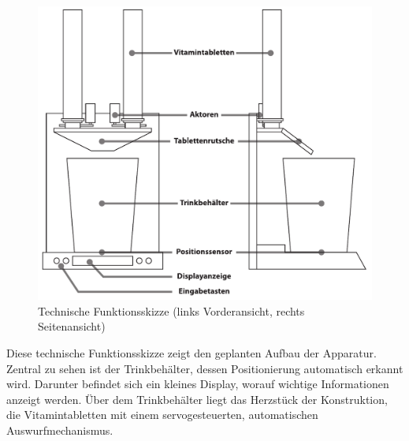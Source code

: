 \begin{figure}[H]
	\centering
	\includegraphics[width=1.0\linewidth]{chapter/Bilder/schematic_bw}
	\caption{Technische Funktionsskizze (links Vorderansicht, rechts Seitenansicht)}
	\label{fig:schematicbw}
\end{figure}

Diese technische Funktionsskizze zeigt den geplanten Aufbau der Apparatur. Zentral zu sehen ist der Trinkbehälter, dessen Positionierung automatisch erkannt wird. Darunter befindet sich ein kleines Display, worauf wichtige Informationen anzeigt werden. Über dem Trinkbehälter liegt das Herzstück der Konstruktion, die Vitamintabletten mit einem servogesteuerten, automatischen Auswurfmechanismus. 